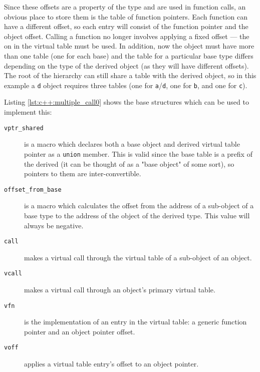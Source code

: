 Since these offsets are a property of the type and are used in function calls,
an obvious place to store them is the table of function pointers.  Each function
can have a different offset, so each entry will consist of the function pointer
and the object offset.  Calling a function no longer involves applying a fixed
offset --- the on in the virtual table must be used.  In addition, now the
object must have more than one table (one for each base) and the table for a
particular base type differs depending on the type of the derived object (as
they will have different offsets).  The root of the hierarchy can still share a
table with the derived object, so in this example a \texttt{d} object requires
three tables (one for \texttt{a}/\texttt{d}, one for \texttt{b}, and one for
\texttt{c}).

Listing \ref{lst:c++:multiple_call0} shows the base structures which can be used
to implement this:

\begin{figure}[ht]
    
\end{figure}

\begin{description}
    \item[\texttt{vptr\_shared}]
        is a macro which declares both a base object and derived virtual table
        pointer as a \texttt{union} member.  This is valid since the base table
        is a prefix of the derived (it can be thought of as a "base object" of
        some sort), so pointers to them are inter-convertible.
    \item[\texttt{offset\_from\_base}]
        is a macro which calculates the offset from the address of a sub-object
        of a base type to the address of the object of the derived type.  This
        value will always be negative.
    \item[\texttt{call}]
        makes a virtual call through the virtual table of a sub-object of an
        object.
    \item[\texttt{vcall}]
        makes a virtual call through an object's primary virtual table.
    \item[\texttt{vfn}]
        is the implementation of an entry in the virtual table: a generic
        function pointer and an object pointer offset.
    \item[\texttt{voff}]
        applies a virtual table entry's offset to an object pointer.
\end{description}

